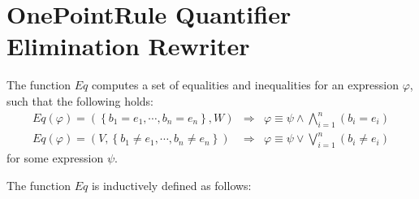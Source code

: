 \documentclass{article}
\begin{document}
\section{OnePointRule Quantifier Elimination Rewriter}

The function $Eq$ computes a set of equalities and inequalities for an
expression $\varphi $, such that the following holds:%
\begin{eqnarray*}
Eq(\varphi) = \left( \left\{ b_{1}=e_{1},\cdots
,b_{n}=e_{n}\right\} ,W\right) & \Rightarrow & \varphi \equiv \psi \wedge
\bigwedge\limits_{i=1}^{n}\left( b_{i}=e_{i}\right)  \\
Eq(\varphi) = \left( V,\left\{ b_{1}\neq e_{1},\cdots
,b_{n}\neq e_{n}\right\} \right) & \Rightarrow & \varphi \equiv \psi \vee
\bigvee\limits_{i=1}^{n}\left( b_{i}\neq e_{i}\right)
\end{eqnarray*}%
for some expression $\psi $.

The function $Eq$ is inductively defined as follows:
\end{document}
